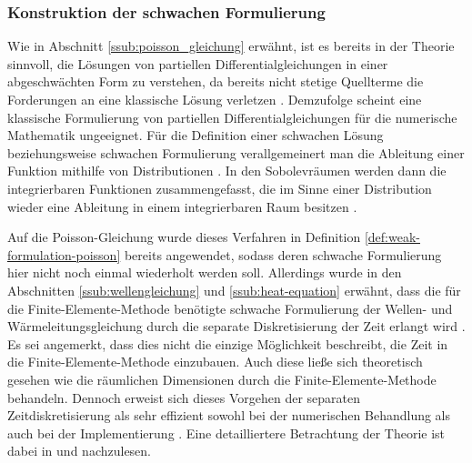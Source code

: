 \documentclass[crop=false]{standalone}
\begin{document}
      \subsubsection{Konstruktion der schwachen Formulierung}
        Wie in Abschnitt \ref{ssub:poisson_gleichung} erwähnt, ist es bereits in der Theorie sinnvoll, die Lösungen von partiellen Differentialgleichungen in einer abgeschwächten Form zu verstehen, da bereits nicht stetige Quellterme die Forderungen an eine klassische Lösung verletzen \cite[S.~46]{Schweizer2013}.
        Demzufolge scheint eine klassische Formulierung von partiellen Differentialgleichungen für die numerische Mathematik ungeeignet.
        Für die Definition einer schwachen Lösung beziehungsweise schwachen Formulierung verallgemeinert man die Ableitung einer Funktion mithilfe von Distributionen \cite[S.~46~ff]{Schweizer2013}.
        In den Sobolevräumen werden dann die integrierbaren Funktionen zusammengefasst, die im Sinne einer Distribution wieder eine Ableitung in einem integrierbaren Raum besitzen \cite[S.~54~ff]{Schweizer2013}.

        Auf die Poisson-Gleichung wurde dieses Verfahren in Definition \ref{def:weak-formulation-poisson} bereits angewendet, sodass deren schwache Formulierung hier nicht noch einmal wiederholt werden soll.
        Allerdings wurde in den Abschnitten \ref{ssub:wellengleichung} und \ref{ssub:heat-equation} erwähnt, dass die für die Finite-Elemente-Methode benötigte schwache Formulierung der Wellen- und Wärmeleitungsgleichung durch die separate Diskretisierung der Zeit erlangt wird \cite{Alberty1998,Logan2007}.
        Es sei angemerkt, dass dies nicht die einzige Möglichkeit beschreibt, die Zeit in die Finite-Elemente-Methode einzubauen.
        Auch diese ließe sich theoretisch gesehen wie die räumlichen Dimensionen durch die Finite-Elemente-Methode behandeln.
        Dennoch erweist sich dieses Vorgehen der separaten Zeitdiskretisierung als sehr effizient sowohl bei der numerischen Behandlung als auch bei der Implementierung \cite{Logan2007}.
        Eine detailliertere Betrachtung der Theorie ist dabei in \cite[S.~211~ff]{Schweizer2013} und \cite[S.~653~ff]{Logan2007} nachzulesen.
\end{document}
